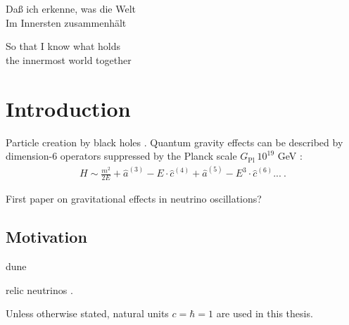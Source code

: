 \begin{savequote}[8cm]
{\frakfamily
Daß ich erkenne, was die Welt \\
Im Innersten zusammenhält
}

So that I know what holds\\
the innermost world together
\end{savequote}

\chapter{\label{ch:1-intro}Introduction}
Particle creation by black holes \cite{Hawking:1975vcx}. Quantum gravity effects can be described by dimension-$6$ operators suppressed by the Planck scale $G_\text{Pl} ~ 10^{19}$ GeV \cite{IceCube:2021tdn}:
%
\begin{align} \label{eq:qg-operator}
    H \sim \frac{m^2}{2E} + \hat{a}^{(3)} - E \cdot \hat{c}^{(4)} + \hat{a}^{(5)} - E^3 \cdot \hat{c}^{(6)} ... \ \text{.}
\end{align}
%

\minitoc

First paper on gravitational effects in neutrino oscillations? \cite{Ahluwalia:1996ev}

\section{Motivation}
\cite{Kayser:2005cd}
\acrfull{dune}

relic neutrinos \cite{Aydiner:2022zcx}.

Unless otherwise stated, natural units $c=\hbar = 1$ are used in this thesis.

